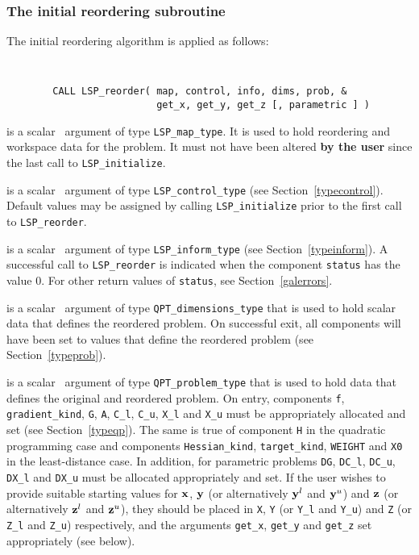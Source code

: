 \documentclass{galahad}
\newcommand{\packagename}{LSP}
\begin{document}
\subsubsection{The initial reordering subroutine}
The initial reordering algorithm is applied as follows: 
\vspace*{-2mm}
{\tt 
\begin{verbatim}
        CALL LSP_reorder( map, control, info, dims, prob, &
                          get_x, get_y, get_z [, parametric ] )
\end{verbatim}
}
\vspace*{-4mm}
\begin{description}
 is a scalar \intentinout\ argument of type 
{\tt \packagename\_map\_type}. 
It is used to hold reordering and workspace data for the problem. 
It must not have been altered {\bf by the user} since the last call
to {\tt \packagename\_initialize}. 
 
 is a scalar \intentin\ argument of type 
{\tt \packagename\_control\_type} 
(see Section~\ref{typecontrol}). 
Default values may be assigned by calling 
{\tt \packagename\_initialize} 
prior to the first call to {\tt \packagename\_reorder}. 
 
 is a scalar \intentout\ argument of type 
{\tt \packagename\_inform\_type} 
(see Section~\ref{typeinform}). 
A successful call to {\tt \packagename\_reor\-der} is indicated 
when the component {\tt status} has the value 0. For other return values 
of {\tt status}, see Section~\ref{galerrors}. 
 
 is a scalar \intentout\ argument of type 
{\tt QPT\_dimensions\_type} that 
is used to hold scalar data that defines the reordered problem. 
On successful exit, all components will have been set to values 
that define the reordered problem (see Section~\ref{typeprob}). 
 
 is a scalar \intentinout\ argument of type 
{\tt QPT\_problem\_type} that 
is used to hold data that defines the original and reordered problem. 
On entry, components {\tt f}, {\tt gradient\_kind}, {\tt G},
{\tt A}, {\tt C\_l}, {\tt C\_u}, {\tt X\_l} and {\tt X\_u} 
must be appropriately allocated and set (see Section~\ref{typeqp}).
The same is true of component {\tt H} in the quadratic programming case
and components {\tt Hessian\_kind}, {\tt target\_kind}, 
{\tt WEIGHT} and {\tt X0} in the least-distance case. 
In addition, for parametric problems
{\tt DG}, {\tt DC\_l}, {\tt DC\_u}, {\tt DX\_l} and {\tt DX\_u}
must be allocated appropriately and set.
If the user wishes to provide suitable starting values for ${\mathbf{x}}$, ${\mathbf{y}}$ 
(or alternatively ${\mathbf{y}}^l$ and ${\mathbf{y}}^u$) and
${\mathbf{z}}$ (or alternatively ${\mathbf{z}}^l$ and ${\mathbf{z}}^u$), 
they should be placed in {\tt X}, {\tt Y} (or {\tt Y\_l} and {\tt Y\_u})
and {\tt Z} (or {\tt Z\_l} and {\tt Z\_u}) respectively,
and the arguments {\tt get\_x}, {\tt get\_y} and {\tt get\_z}
set appropriately (see below). 


\end{description}
\end{document}
